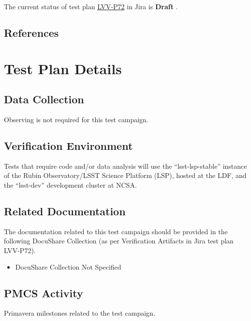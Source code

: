 \documentclass[DM,lsstdraft,STR,toc]{lsstdoc}
\begin{document}
The current status of test plan \href{https://jira.lsstcorp.org/secure/Tests.jspa\#/testPlan/LVV-P72}{LVV-P72} in Jira is \textbf{ Draft }.

\subsection{References}
\label{sect:references}
\renewcommand{\refname}{}



\newpage
\section{Test Plan Details}
\label{sect:testplan}


\subsection{Data Collection}

  Observing is not required for this test campaign.

\subsection{Verification Environment}
\label{sect:hwconf}
  Tests that require code and/or data analysis will use the
``lsst-lsp-stable'' instance of the Rubin Observatory/LSST Science
Platform (LSP), hosted at the LDF, and the ``lsst-dev'' development
cluster at NCSA.




\subsection{Related Documentation}

The documentation related to this test campaign should be provided in the following DocuShare Collection
(as per Verification Artifacts in Jira test plan LVV-P72).

\begin{itemize}
\item DocuShare Collection Not Specified
\end{itemize}



\subsection{PMCS Activity}

Primavera milestones related to the test campaign.
\end{document}
